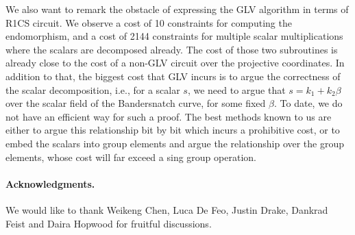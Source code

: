\documentclass{article}
\theoremstyle{definition}
\begin{document}
We also want to remark the obstacle of expressing the 
GLV algorithm in terms of R1CS circuit. We observe a cost of 10 
constraints for computing the endomorphism, and a cost of 2144 
constraints for multiple scalar multiplications where the 
scalars are decomposed already. The cost of those two subroutines
 is already close
to the cost of a non-GLV circuit over the projective 
coordinates. In addition to that, the biggest cost that 
GLV incurs is to argue the correctness of the scalar 
decomposition, i.e., for a scalar $s$, we need to argue 
that $s = k_1 + k_2 \beta$ over the scalar field of the
Bandersnatch curve, 
for some fixed $\beta$. To date, we do not have an 
efficient way for such a proof. The best methods known to us are
either to argue this relationship bit by bit which incurs a
prohibitive cost, or to 
embed the scalars into group elements and argue the relationship
over the group elements, whose cost will far exceed a 
sing group operation.



  




\bigskip
\paragraph*{\textbf{Acknowledgments.}} We would like to thank Weikeng Chen, Luca De
Feo, Justin Drake, Dankrad Feist and Daira Hopwood for
fruitful discussions.



\end{document}
